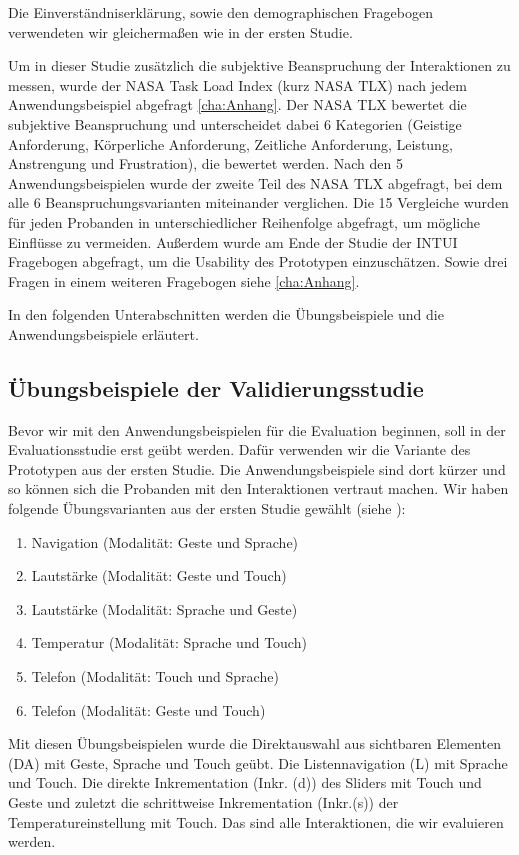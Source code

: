 Die Einverständniserklärung, sowie den demographischen Fragebogen verwendeten wir gleichermaßen wie in der ersten Studie. 

Um in dieser Studie zusätzlich die subjektive Beanspruchung der Interaktionen zu messen, wurde der NASA Task Load Index (kurz NASA TLX) nach jedem Anwendungsbeispiel abgefragt \ref{cha:Anhang}. 
Der NASA TLX bewertet die subjektive Beanspruchung und unterscheidet dabei 6 Kategorien (Geistige Anforderung, Körperliche Anforderung, Zeitliche Anforderung, Leistung, Anstrengung und Frustration), die bewertet werden. 
Nach den 5 Anwendungsbeispielen wurde der zweite Teil des NASA TLX abgefragt, bei dem alle 6 Beanspruchungsvarianten miteinander verglichen. 
Die 15 Vergleiche wurden für jeden Probanden in unterschiedlicher Reihenfolge abgefragt, um mögliche Einflüsse zu vermeiden. 
Außerdem wurde am Ende der Studie der INTUI Fragebogen abgefragt, um die Usability des Prototypen einzuschätzen. 
Sowie drei Fragen in einem weiteren Fragebogen siehe \ref{cha:Anhang}. 
  
In den folgenden Unterabschnitten werden die Übungsbeispiele und die Anwendungsbeispiele erläutert. 
\subsection[Übungsbeispiele]{Übungsbeispiele der Validierungsstudie}
Bevor wir mit den Anwendungsbeispielen für die Evaluation beginnen, soll in der Evaluationsstudie erst geübt werden. 
Dafür verwenden wir die Variante des Prototypen aus der ersten Studie. 
Die Anwendungsbeispiele sind dort kürzer und so können sich die Probanden mit den Interaktionen vertraut machen.
Wir haben folgende Übungsvarianten aus der ersten Studie gewählt (siehe ):
\begin{enumerate}
	\item Navigation (Modalität: Geste und Sprache)
	\item Lautstärke (Modalität: Geste und Touch)
	\item Lautstärke (Modalität: Sprache und Geste)
	\item Temperatur (Modalität: Sprache und Touch)
	\item Telefon (Modalität: Touch und Sprache)
	\item Telefon (Modalität: Geste und Touch)
\end{enumerate}
Mit diesen Übungsbeispielen wurde die Direktauswahl aus sichtbaren Elementen (DA) mit Geste, Sprache und Touch geübt. 
Die Listennavigation (L) mit Sprache und Touch. 
Die direkte Inkrementation (Inkr. (d)) des Sliders mit Touch und Geste und zuletzt die schrittweise Inkrementation (Inkr.(s)) der Temperatureinstellung mit Touch. 
Das sind alle Interaktionen, die wir evaluieren werden. 
